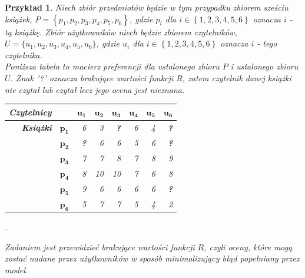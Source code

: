 \documentclass[12pt,a4paper]{report}
\newtheorem{przyklad}{Przykład}[chapter]
\newcommand{\set}[1]{\left\lbrace {#1} \right\rbrace}
\newcommand{\setUzytkownicy}{\mathit{U}}
\newcommand{\setPrzedmioty}{\mathit{P}}
\begin{document}
\begin{przyklad}
Niech zbiór przedmiotów będzie w tym przypadku zbiorem sześciu książek, $\setPrzedmioty = \set{p_1, p_2, p_3, p_4, p_5, p_6}$, gdzie $p_i$ dla $i \in \set{1,2,3,4,5,6}$ oznacza $i$ - tą książkę. Zbiór użytkowników niech będzie zbiorem czytelników, $\setUzytkownicy = \{u_1, u_2, u_3, u_4, u_5, u_6\}$, gdzie $u_i$ dla $i \in \set{1,2,3,4,5,6}$ oznacza $i$ - tego czytelnika.
\\Poniższa tabela to macierz preferencji dla ustalonego zbioru $\setPrzedmioty$ i ustalonego zbioru $\setUzytkownicy$. Znak '?' oznacza brakujące wartości funkcji $R$, zatem czytelnik danej książki nie czytał lub czytał lecz jego ocena jest nieznana.
\begin{center}
\begin{tabular}{|r|r|r|r|r|r|r|r|} \hline
\textbf{Czytelnicy} & & $\mathbf{u_1}$ & $\mathbf{u_2}$ & $\mathbf{u_3}$ & $\mathbf{u_4}$ & $\mathbf{u_5}$ & $\mathbf{u_6}$ \\
\hline
\hline
\textbf{Książki} &$\mathbf{p_1}$ & 6 & 3 & \textbf{?} & 6 & 4 & \textbf{?} \\
\hline
&$\mathbf{p_2}$ & \textbf{?} & 6 & 6 & 5 & 6 & \textbf{?} \\
\hline
&$\mathbf{p_3}$ & 7 & 7 & 8 & 7 & 8 & 9  \\
\hline
&$\mathbf{p_4}$ & 8 & 10 & 10 & 7 & 6 & 8 \\
\hline
&$\mathbf{p_5}$ & 9 & 6 & 6 & 6 & 6 & \textbf{?} \\
\hline
&$\mathbf{p_6}$ & 5 & 7 & 7 & 5 & 4 & 2 \\
\hline
\end{tabular}.
\end{center}

Zadaniem jest przewidzieć brakujące wartości funkcji $R$, czyli oceny, które mogą zostać nadane przez użytkowników w sposób minimalizujący błąd popełniany przez model.
\end{przyklad}
\end{document}
